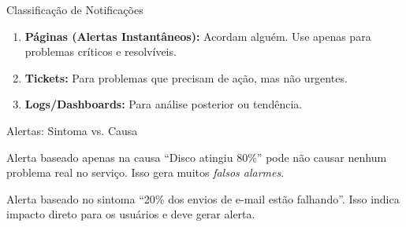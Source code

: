 \documentclass[9pt]{beamer}
\begin{document}
\begin{frame}{Classificação de Notificações}
\begin{enumerate}
    \item \textbf{Páginas (Alertas Instantâneos):} Acordam alguém. Use apenas para problemas críticos e resolvíveis.
    \item \textbf{Tickets:} Para problemas que precisam de ação, mas não urgentes.
    \item \textbf{Logs/Dashboards:} Para análise posterior ou tendência.
\end{enumerate}
\end{frame}
\begin{frame}{Alertas: Sintoma vs. Causa}

\begin{center}
\end{center}

\begin{alertblock}{Alerta baseado apenas na causa}
``Disco atingiu 80\%'' pode não causar nenhum problema real no serviço.
Isso gera muitos \textit{falsos alarmes}.
\end{alertblock}

\begin{exampleblock}{Alerta baseado no sintoma}
``20\% dos envios de e-mail estão falhando''.  
Isso indica impacto direto para os usuários e deve gerar alerta.
\end{exampleblock}

\end{frame}
\end{document}
